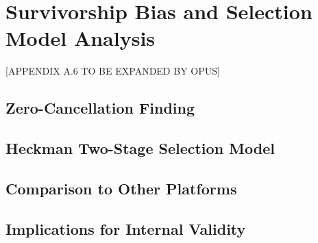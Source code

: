 \section{Survivorship Bias and Selection Model Analysis}
\label{sec:A6}

[APPENDIX A.6 TO BE EXPANDED BY OPUS]

\subsection{Zero-Cancellation Finding}

\subsection{Heckman Two-Stage Selection Model}

\subsection{Comparison to Other Platforms}

\subsection{Implications for Internal Validity}
